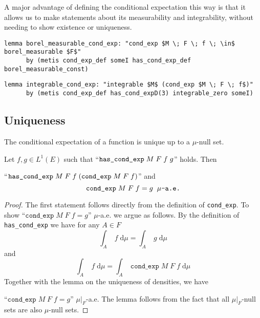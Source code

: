 A major advantage of defining the conditional expectation this way is that it allows us to make statements about its measurability and integrability, without needing to show existence or uniqueness.

\begin{isalemma}
{\small
	\begin{lstlisting}[style=isabelle]
	lemma borel_measurable_cond_exp: "cond_exp $M \; F \; f \; \in$ borel_measurable $F$"
	  by (metis cond_exp_def someI has_cond_exp_def borel_measurable_const)
	\end{lstlisting}
}
\end{isalemma}

\begin{isalemma}
{\small
	\begin{lstlisting}[style=isabelle]
	lemma integrable_cond_exp: "integrable $M$ (cond_exp $M \; F \; f$)"
	  by (metis cond_exp_def has_cond_expD(3) integrable_zero someI)
	\end{lstlisting}
}
\end{isalemma}

\subsection{Uniqueness}

The conditional expectation of a function is unique up to a $\mu$-null set. 

\begin{lemma}
	Let $f, g \in L^1(E)$ such that ``$\normalfont\texttt{has\_cond\_exp} \; M \; F \; f \; g$'' holds. Then 
	\par\noindent ``$\normalfont\texttt{has\_cond\_exp} \; M \; F \; f \; (\texttt{cond\_exp} \; M \; F \; f)$'' and
	\[
		\normalfont\texttt{cond\_exp} \; M \; F \; f = g \;\; \mu\texttt{-a.e.}
	\]
\end{lemma}
\begin{proof}
	The first statement follows directly from the definition of \texttt{cond\_exp}. To show ``$\texttt{cond\_exp} \; M \; F \; f = g$'' $\mu$-a.e. we argue as follows. By the definition of \texttt{has\_cond\_exp} we have for any $A \in F$
	\[
		\int_A \; f \; \textrm{d}\mu = \int_A \; g \; \textrm{d}\mu
	\]
	and
	\[
		\int_A \; f \; \textrm{d}\mu = \int_A \; \texttt{cond\_exp} \; M \; F \; f \; \textrm{d}\mu
	\]
	Together with the lemma on the uniqueness of densities, we have 
	\par\noindent``$\texttt{cond\_exp} \; M \; F \; f = g$'' $\mu\vert_F$-a.e. The lemma follows from the fact that all $\mu\vert_F$-null sets are also $\mu$-null sets.
\end{proof}

